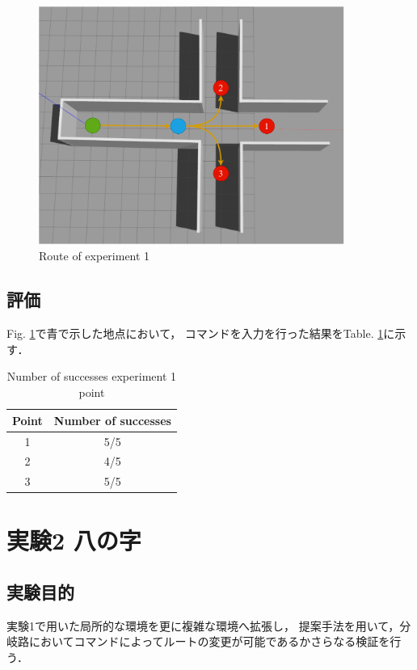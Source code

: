 \begin{figure}[ht]
    \centering
    \includegraphics[width = 10cm]{./figs/zyuziroute.pdf}
    \caption{Route of experiment 1}
    \label{fig::exp1route}
\end{figure}

\subsection{評価}

Fig. \ref{fig::exp1route}で青で示した地点において，
コマンドを入力を行った結果をTable. \ref{tb::exp1suc}に示す．
\begin{table}[H]
  \centering
  \caption{Number of successes experiment 1 point}
  \begin{tabular}{|c|c|}
  \hline
  Point & Number of successes \\ \hline
  1     & 5/5                  \\ \hline
  2     & 4/5                  \\ \hline
  3     & 5/5                  \\ \hline
  \end{tabular}
  
  \label{tb::exp1suc}
  \end{table}

\newpage
\section{実験2 八の字}
\subsection{実験目的}
実験1で用いた局所的な環境を更に複雑な環境へ拡張し，
提案手法を用いて，分岐路においてコマンドによってルートの変更が可能であるかさらなる検証を行う．
